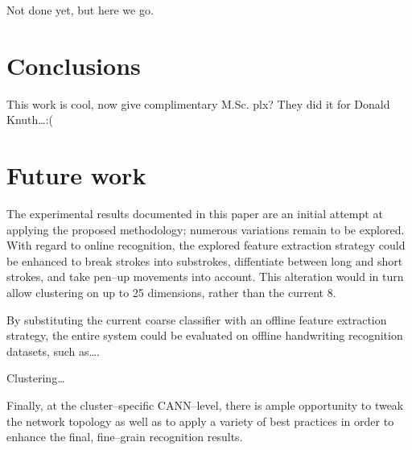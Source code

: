 \documentclass[10pt,conference,a4paper]{IEEEtran}
\begin{document}
	Not done yet, but here we go.


	\section{Conclusions}
	\label{sec:conclusions}

	This work is cool, now give complimentary M.Sc. plx?
	They did it for Donald Knuth\ldots :(


	\section{Future work}
	\label{sec:future_work}

	The experimental results documented in this paper are an initial attempt at applying the proposed methodology;
	numerous variations remain to be explored. With regard to online recognition, the explored feature extraction
	strategy could be enhanced to break strokes into substrokes, diffentiate between long and short strokes, and take
	pen--up movements into account. This alteration would in turn allow clustering on up to 25 dimensions, rather than the current 8.

	By substituting the current coarse classifier with an offline feature extraction strategy, the entire system could
	be evaluated on offline handwriting recognition datasets, such as\ldots. 

	Clustering\ldots

	Finally, at the cluster--specific CANN--level, there is ample opportunity to tweak the network topology as well as
	to apply a variety of best practices \cite{simard2003best} in order to enhance the final, fine--grain recognition results.



	
\end{document}
